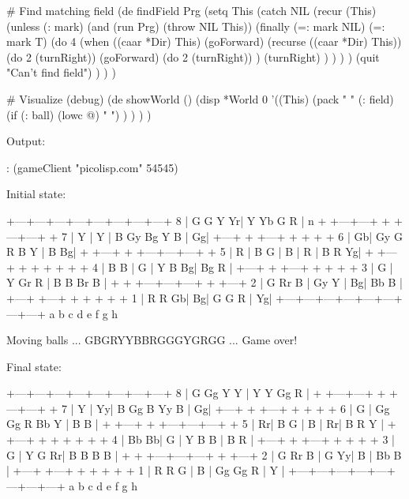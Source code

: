 \begin{wideverbatim}


# Find matching field
(de findField Prg
   (setq This
      (catch NIL
         (recur (This)
            (unless (: mark)
               (and (run Prg) (throw NIL This))
               (finally (=: mark NIL)
                  (=: mark T)
                  (do 4
                     (when ((caar *Dir) This)
                        (goForward)
                        (recurse ((caar *Dir) This))
                        (do 2 (turnRight))
                        (goForward)
                        (do 2 (turnRight)) )
                     (turnRight) ) ) ) )
         (quit "Can't find field") ) ) )

# Visualize (debug)
(de showWorld ()
   (disp *World 0
      '((This)
         (pack " "
            (: field)
            (if (: ball) (lowc @) " ") ) ) ) )



\end{wideverbatim}

\begin{wideverbatim}

Output:

: (gameClient "picolisp.com" 54545)

Initial state:

   +---+---+---+---+---+---+---+---+
 8 | G   G   Y   Yr| Y   Yb  G   R |
n   +   +---+---+   +   +---+---+   +
 7 | Y | Y | B   Gy  Bg  Y   B | Gg|
   +---+   +   +---+   +   +   +   +
 6 | Gb| Gy  G   R   B   Y | B   Bg|
   +   +---+   +   +---+---+---+   +
 5 | R | B   G | B | R | B   R   Yg|
   +   +---+   +   +   +   +   +   +
 4 | B   B | G | Y   B   Bg| Bg  R |
   +---+   +   +---+   +   +   +   +
 3 | G | Y   Gr  R | B   B   Br  B |
   +   +   +---+---+---+   +   +---+
 2 | G   Rr  B | Gy  Y | Bg| Bb  B |
   +---+   +---+   +   +   +   +   +
 1 | R   R   Gb| Bg| G   G   R | Yg|
   +---+---+---+---+---+---+---+---+
     a   b   c   d   e   f   g   h

Moving balls ... GBGRYYBBRGGGYGRGG ... Game over!

Final state:

   +---+---+---+---+---+---+---+---+
 8 | G   Gg  Y   Y | Y   Y   Gg  R |
   +   +---+---+   +   +---+---+   +
 7 | Y | Yy| B   Gg  B   Yy  B | Gg|
   +---+   +   +---+   +   +   +   +
 6 | G | Gg  Gg  R   Bb  Y | B   B |
   +   +---+   +   +---+---+---+   +
 5 | Rr| B   G | B | Rr| B   R   Y |
   +   +---+   +   +   +   +   +   +
 4 | Bb  Bb| G | Y   B   B | B   R |
   +---+   +   +---+   +   +   +   +
 3 | G | Y   G   Rr| B   B   B   B |
   +   +   +---+---+---+   +   +---+
 2 | G   Rr  B | G   Yy| B | Bb  B |
   +---+   +---+   +   +   +   +   +
 1 | R   R   G | B | Gg  Gg  R | Y |
   +---+---+---+---+---+---+---+---+
     a   b   c   d   e   f   g   h

\end{wideverbatim}

